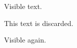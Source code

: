 \documentclass{article}
\begin{document}
Visible text.

\begin{hidden}
This text is discarded.
\end{hidden}

Visible again.
\end{document}
